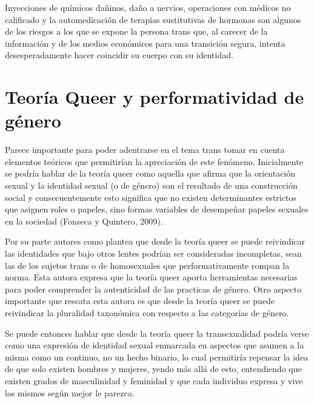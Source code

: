 Inyecciones de químicos dañinos, daño a nervios, operaciones con médicos no
calificado y la automedicación de terapias sustitutivas de hormonas son algunos
de los riesgos a los que se expone la persona trans que, al carecer de la
información y de los  medios económicos para una transición segura, intenta
desesperadamente hacer coincidir  su cuerpo con su identidad.


\section{Teoría Queer y performatividad de género}

Parece importante para poder adentrarse en el tema trans tomar en cuenta elementos teóricos que permitirían la apreciación de este fenómeno. Inicialmente se podría hablar de la teoría queer como aquella que afirma que la orientación sexual y la identidad sexual (o de género) son el resultado de una construcción social y consecuentemente esto significa que no existen determinantes estrictos que asignen roles o papeles, sino formas variables de desempeñar papeles sexuales en la sociedad (Fonseca y Quintero, 2009).

Por su parte autores como \textcite{Solana2013} plantea que desde la teoría
queer se puede reivindicar las identidades que bajo otros lentes podrían ser
consideradas incompletas, sean las de los sujetos trans o de homosexuales que
performativamente rompan la norma. Esta autora expresa que la teoría queer
aporta herramientas necesarias para poder comprender la autenticidad de las
practicas de género. Otro aspecto importante que rescata esta autora es que
desde la teoría queer se puede reivindicar la pluralidad taxonómica con respecto
a las categorías de género.

Se puede entonces hablar que desde la teoría queer la transexualidad podría
verse como una expresión de identidad sexual enmarcada en aspectos que asumen a
la misma como un continuo, no un hecho binario, lo cual permitiría repensar la
idea de que solo existen hombres y mujeres, yendo más allá de esto, entendiendo
que existen grados de masculinidad y feminidad y que cada individuo expresa y
vive los mismos según mejor le parezca.



